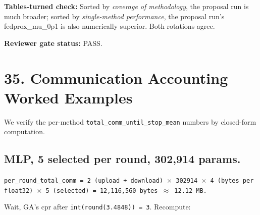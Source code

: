 \documentclass{article}
\begin{document}
\textbf{Tables-turned check:} Sorted by \emph{coverage of methodology}, the proposal run is much broader; sorted by \emph{single-method performance}, the proposal run's fedprox\_mu\_0p1 is also numerically superior. Both rotations agree.


\textbf{Reviewer gate status:} PASS.



\clearpage
\section{35. Communication Accounting Worked Examples}


We verify the per-method \texttt{total\_comm\_until\_stop\_mean} numbers by closed-form computation.


\subsection{MLP, 5 selected per round, 302,914 params.}


\texttt{per\_round\_total\_comm = 2 (upload + download) \ensuremath{\times} 302914 \ensuremath{\times} 4 (bytes per float32) \ensuremath{\times} 5 (selected) = 12,116,560 bytes \ensuremath{\approx} 12.12 MB.}


\begin{table}[H]
  \centering
  \scriptsize
\end{table}


Wait, GA's cpr after \texttt{int(round(3.4848)) = 3}. Recompute:
\end{document}
